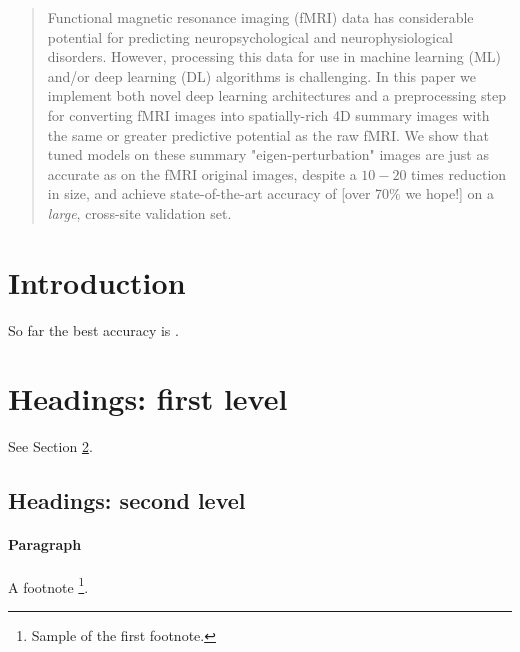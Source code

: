 \documentclass[10pt]{article}
\begin{document}
\maketitle

\begin{abstract}
  Functional magnetic resonance imaging (fMRI) data has considerable potential
  for predicting neuropsychological and neurophysiological disorders. However, processing this data
  for use in machine learning (ML) and/or deep learning (DL) algorithms is challenging. In this
  paper we implement both novel deep learning architectures and a preprocessing step for converting
  fMRI images into spatially-rich 4D summary images with the same or greater predictive potential as
  the raw fMRI. We show that tuned models on these summary "eigen-perturbation" images are just as
  accurate as on the fMRI original images, despite a \(10-20\) times reduction in size, and achieve
  state-of-the-art accuracy of [over 70\% we hope!] on a \emph{large}, cross-site validation set.
\end{abstract}

\section{Introduction}

So far the best accuracy is \citep{heinsfeldIdentificationAutismSpectrum2018}.

\section{Headings: first level}
\label{sec:headings}

See Section \ref{sec:headings}.

\subsection{Headings: second level}
\paragraph{Paragraph}

A footnote \footnote{Sample of the first footnote.}.



\end{document}
